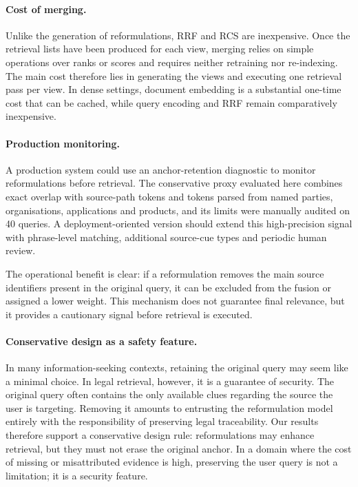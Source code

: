 \documentclass[a4paper,fleqn]{cas-dc}
\begin{document}
\paragraph{Cost of merging.}
Unlike the generation of reformulations, RRF and RCS are inexpensive. Once the retrieval lists have been produced for each view, merging relies on simple operations over ranks or scores and requires neither retraining nor re-indexing. The main cost therefore lies in generating the views and executing one retrieval pass per view. In dense settings, document embedding is a substantial one-time cost that can be cached, while query encoding and RRF remain comparatively inexpensive.
\paragraph{Production monitoring.}
A production system could use an anchor-retention diagnostic to monitor
reformulations before retrieval. The conservative proxy evaluated here
combines exact overlap with source-path tokens and tokens parsed from
named parties, organisations, applications and products, and its limits
were manually audited on 40 queries. A deployment-oriented version
should extend this high-precision signal with phrase-level matching,
additional source-cue types and periodic human review.

The operational benefit is clear: if a reformulation removes the main
source identifiers present in the original query, it can be excluded
from the fusion or assigned a lower weight. This mechanism does not
guarantee final relevance, but it provides a cautionary signal before
retrieval is executed.
\paragraph{Conservative design as a safety feature.}
In many information-seeking contexts, retaining the original query may seem like a minimal choice. In legal retrieval, however, it is a guarantee of security. The original query often contains the only available clues regarding the source the user is targeting. Removing it amounts to entrusting the reformulation model entirely with the responsibility of preserving legal traceability.
Our results therefore support a conservative design rule: reformulations may enhance retrieval, but they must not erase the original anchor. In a domain where the cost of missing or misattributed evidence is high, preserving the user query is not a limitation; it is a security feature.
\end{document}
